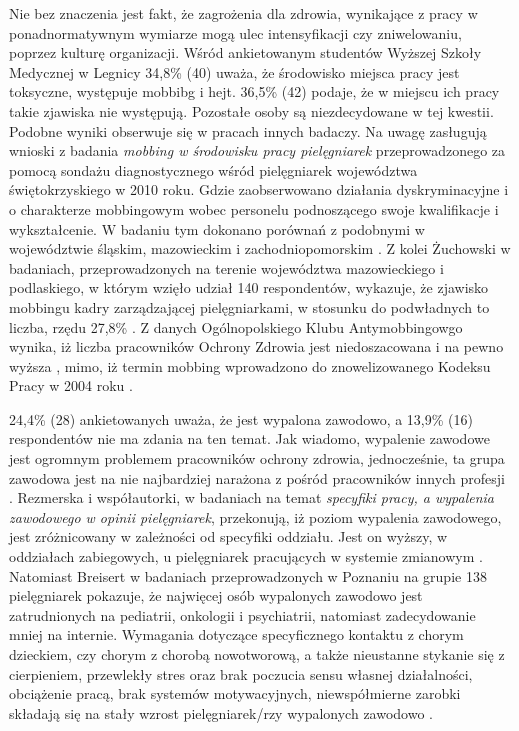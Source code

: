 \documentclass[a4paper,12pt,twoside,openright]{mwrep}
\begin{document}
Nie bez znaczenia jest fakt, że zagrożenia  dla zdrowia, wynikające z pracy w ponadnormatywnym wymiarze mogą ulec intensyfikacji czy zniwelowaniu, poprzez kulturę organizacji. Wśród ankietowanym studentów Wyższej Szkoły Medycznej w Legnicy 34,8\% (40) uważa, że środowisko miejsca pracy jest toksyczne, występuje mobbibg i hejt. 36,5\% (42) podaje, że w miejscu ich pracy takie zjawiska nie występują. Pozostałe osoby są niezdecydowane w tej kwestii.  Podobne wyniki obserwuje się w pracach innych badaczy. Na uwagę zasługują wnioski z badania \textit{mobbing w środowisku pracy pielęgniarek} przeprowadzonego za pomocą sondażu diagnostycznego wśród pielęgniarek województwa świętokrzyskiego w 2010 roku. Gdzie zaobserwowano działania dyskryminacyjne i o charakterze mobbingowym wobec personelu podnoszącego swoje kwalifikacje i wykształcenie. W badaniu tym dokonano porównań z podobnymi w województwie śląskim, mazowieckim i zachodniopomorskim \cite{mobbing}. Z kolei Żuchowski w badaniach, przeprowadzonych na terenie województwa mazowieckiego i podlaskiego, w którym wzięło udział 140 respondentów, wykazuje, że zjawisko mobbingu kadry zarządzającej pielęgniarkami, w stosunku do podwładnych to liczba, rzędu 27,8\% \cite{zuchowski}. Z danych Ogólnopolskiego Klubu Antymobbingowgo wynika, iż liczba pracowników Ochrony Zdrowia jest niedoszacowana i na pewno wyższa \cite{grabowski}, mimo, iż termin mobbing wprowadzono do znowelizowanego Kodeksu Pracy w 2004 roku \cite{kodeks}.





24,4\% (28) ankietowanych uważa, że jest wypalona zawodowo, a 13,9\% (16) respondentów nie ma zdania na ten temat. Jak wiadomo, wypalenie zawodowe jest ogromnym problemem pracowników ochrony zdrowia, jednocześnie, ta grupa zawodowa jest na nie najbardziej narażona z pośród pracowników innych profesji \cite{wypal}. Rezmerska i współautorki, w badaniach na temat \textit{specyfiki pracy, a wypalenia zawodowego w opinii pielęgniarek},  przekonują, iż poziom wypalenia zawodowego, jest zróżnicowany w zależności od specyfiki oddziału. Jest on wyższy, w oddziałach zabiegowych, u pielęgniarek pracujących w systemie zmianowym \cite{zmiany}. Natomiast Breisert w badaniach przeprowadzonych w Poznaniu na grupie 138 pielęgniarek pokazuje, że najwięcej osób wypalonych zawodowo jest zatrudnionych na pediatrii, onkologii i psychiatrii, natomiast zadecydowanie mniej na internie. Wymagania dotyczące specyficznego kontaktu z chorym dzieckiem, czy chorym z  chorobą nowotworową,  a także nieustanne stykanie się z cierpieniem,  przewlekły stres oraz brak poczucia sensu własnej działalności, obciążenie pracą, brak systemów motywacyjnych, niewspółmierne zarobki składają się na stały wzrost  pielęgniarek/rzy wypalonych zawodowo \cite{breisert}.
\end{document}
